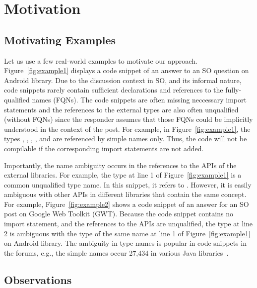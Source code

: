 \section{Motivation}
\label{motiv:sec}

\subsection{Motivating Examples}
\label{examples:sec}



Let us use a few real-world examples to motivate our approach.
Figure~\ref{fig:example1} displays a code snippet of an answer to an
SO question on Android library. Due to the discussion context in SO,
and its informal nature, code snippets rarely contain sufficient
declarations and references to the fully-qualified names (FQNs). The
code snippets are often missing neccessary import statements and the
references to the external types are also often unqualified (without
FQNs) since the responder assumes that those FQNs could be implicitly
understood in the context of the post. For example, in
Figure~\ref{fig:example1}, the types , ,
, , and  are referenced by simple
names only. Thus, the code will not be compilable if the corresponding
import statements are not added.



Importantly, the name ambiguity occurs in the references to the APIs
of the external libraries. For example, the type  at line
1 of Figure~\ref{fig:example1} is a common unqualified type name. In
this snippet, it refers to . However, it
is easily ambiguous with other APIs in different libraries that
contain the same concept. For example, Figure~\ref{fig:example2} shows
a code snippet of an answer for an SO post on Google Web Toolkit
(GWT). Because the code snippet contains no import statement, and the
references to the APIs are unqualified, the type  at line
2 is ambiguous with the type of the same name at line 1 of
Figure~\ref{fig:example1} on Android library. The ambiguity in type
names is popular in code snippets in the forums, e.g., the
simple names  occur 27,434 in various Java
libraries~\cite{liveapi14}.

\subsection{Observations}
\label{sec:obs}

